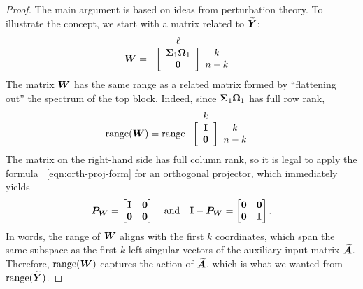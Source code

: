 \documentclass[final]{siamltex}
\begin{document}
\begin{proof}
The main argument is based on ideas from perturbation theory.  To illustrate the concept, we start with a matrix related to $\widetilde{\bm{Y}}$:
$$
\begin{array}{@{}c@{}c@{}c}
& \ell & \\
    \mtx{W} = \left. \begin{array}{@{}c} \\ \\ \end{array} \right[ &
    \begin{array}{c} \mtx{\Sigma}_1 \mtx{\Omega}_1 \\
    \mtx{0} \end{array} &
    \left] \begin{array}{c} k \\ n - k \end{array} \right.
    \end{array}
$$
The matrix $\bm{W}$ has the same range as a related matrix formed by ``flattening out'' the spectrum of the top block.  Indeed, since $\bm{\Sigma}_1 \bm{\Omega}_1$ has full row rank,
$$
\begin{array}{@{}c@{}c@{}c}
& k & \\
    \range(\mtx{W}) = \range \left. \begin{array}{@{}c} \\ \\ \end{array} \right[ &
    \begin{array}{c} \Id \\
    \mtx{0} \end{array} &
    \left] \begin{array}{c} k \\ n - k \end{array} \right.
    \end{array}
$$
The matrix on the right-hand side has full column rank, so it is legal to apply the formula
~\eqref{eqn:orth-proj-form} for an orthogonal projector, which immediately yields
\begin{equation} \label{eqn:IPW}
\mtx{P}_{\mtx{W}}
	= \begin{bmatrix} \Id & \mtx{0} \\ \mtx{0} & \mtx{0} \end{bmatrix}
\quad\text{and}\quad
\Id - \mtx{P}_{\mtx{W}}
	= \begin{bmatrix} \mtx{0} & \mtx{0} \\ \mtx{0} & \Id \end{bmatrix}.
\end{equation}
In words, the range of $\bm{W}$ aligns with the first $k$ coordinates, which span the same subspace as the first $k$ left singular vectors of the auxiliary input matrix $\widetilde{\bm{A}}$.  Therefore, $\operatorname{range}(\bm{W})$ captures the action of $\widetilde{\bm{A}}$, which is what we wanted from $\operatorname{range}(\widetilde{\bm{Y}})$.


\end{proof}
\end{document}
